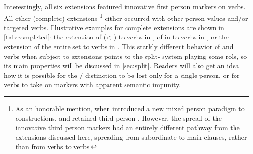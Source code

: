 Interestingly, all six extensions featured innovative first person markers on  verbs.
All other (complete) extensions%
\footnote{As an honorable mention, when \ikpeng introduced a new mixed person paradigm to \setone constructions,   and   retained third person  \parencite[12]{matter2019arara}.
	However, the spread of the innovative third person markers had an entirely different pathway from the extensions discussed here, spreading from subordinate to main clauses, rather than from verbs to verbs.} either occurred with other person values and/or targeted  verbs.
Illustrative examples for complete extensions are shown in \cref{tab:completed}: the extension of   (< ) to  verbs in \apalai {}, of   in to  verbs in \panare {}, or the extension of the entire  set to  verbs in \waimiri {}. %
This starkly different behavior of  and  verbs when subject to extensions points to the split- system playing some role, so its main properties will be discussed in \cref{sec:split}.
Readers will also get an idea how it is possible for the / distinction to be lost only for a single person, or for  verbs to take on  markers with apparent semantic impunity.



